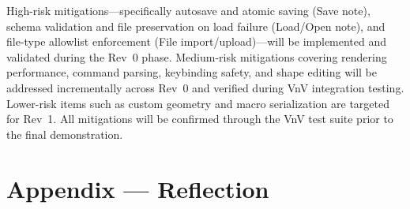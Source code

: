 \documentclass{article}
\begin{document}
High-risk mitigations---specifically autosave and atomic saving (Save note), schema validation and file preservation on load failure (Load/Open note), and file-type allowlist enforcement (File import/upload)---will be implemented and validated during the Rev~0 phase. Medium-risk mitigations covering rendering performance, command parsing, keybinding safety, and shape editing will be addressed incrementally across Rev~0 and verified during VnV integration testing. Lower-risk items such as custom geometry and macro serialization are targeted for Rev~1. All mitigations will be confirmed through the VnV test suite prior to the final demonstration.

\newpage{}

\section*{Appendix --- Reflection}



\end{document}
